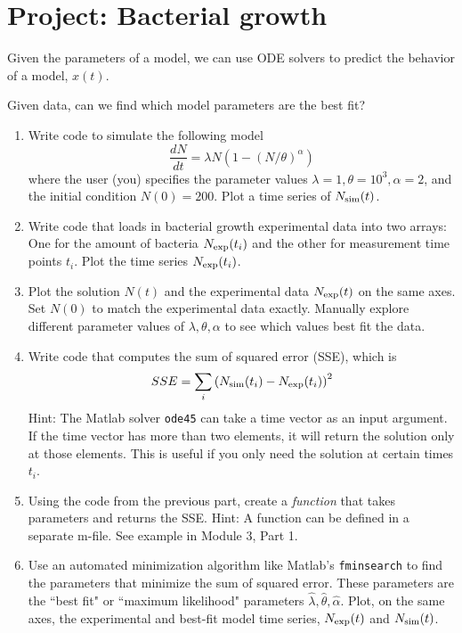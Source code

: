 \documentclass{exam}
\begin{document}
\section*{Project: Bacterial growth}
 
 
Given the parameters of a model, we can use ODE solvers to predict the behavior of a model, $x(t)$. 

Given data, can we find which model parameters are the best fit? 


\begin{enumerate}[a]
\item Write code to simulate the following model
\begin{equation}
\frac{dN}{dt} = \lambda N \left( 1 - \left(N/\theta\right)^\alpha\right)  \label{eq:generalized_logistic}
\end{equation}
where the user (you) specifies the parameter values $\lambda=1,\theta=10^3,\alpha=2$, and the initial condition $N(0)=200$. Plot a time series of $N_{\rm sim}(t)$.
\item Write code that loads in bacterial growth experimental data into two arrays: One for the amount of bacteria $N_{\rm exp}(t_i)$ and the other for measurement time points $t_i$. Plot the time series $N_{\rm exp}(t_i)$. 
\item Plot the solution $N(t)$ and the experimental data $N_{\rm exp}(t)$ on the same axes. Set $N(0)$ to match the experimental data exactly. 
Manually explore different parameter values of $\lambda,\theta,\alpha$ to see which values best fit the data.
\item Write code that computes the sum of squared error (SSE), which is 
\begin{equation}
SSE = \sum_i \left( N_{\rm sim}(t_i) - N_{\rm exp}(t_i)\right)^2
\end{equation}
Hint: The Matlab solver \verb|ode45| can take a time vector as an input argument. If the time vector has more than two elements, it will return the solution only at those elements. This is useful if you only need the solution at certain times $t_i$. 
\item Using the code from the previous part, create a \textit{function} that takes parameters and returns the SSE.
Hint: A function can be defined in a separate m-file. See example in Module 3, Part 1.  
\item Use an automated minimization algorithm like Matlab's \verb|fminsearch| to find the parameters that minimize the sum of squared error. 
These parameters are the ``best fit" or ``maximum likelihood" parameters $\hat\lambda,\hat\theta,\hat\alpha$.  
Plot, on the same axes, the experimental and best-fit model time series, $N_{\rm exp}(t)$ and $N_{\rm sim}(t)$.


\end{enumerate}
\end{document}
